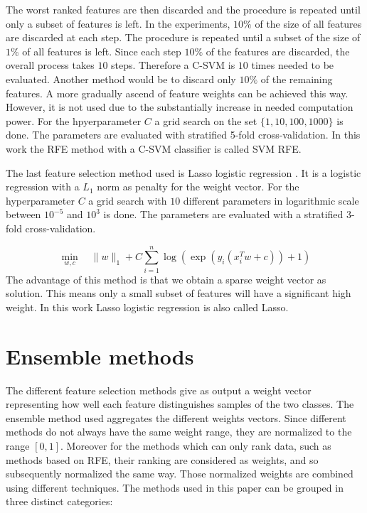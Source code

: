 \documentclass[twoside,11pt]{article}
\begin{document}
The worst ranked features are then discarded and the procedure is repeated until only a subset of features is left. In the experiments, $10\%$ of the size of all features are discarded at each step. The procedure is repeated until a subset of the size of $1\%$ of all features is left. Since each step $10\%$ of the features are discarded, the overall process takes $10$ steps. Therefore a C-SVM is $10$ times needed to be evaluated. Another method would be to discard only $10\%$ of the remaining features. A more gradually ascend of feature weights can be achieved this way. However, it is not used due to the substantially increase in needed computation power. For the hpyerparameter $C$ a grid search on the set $\{1, 10, 100, 1000\}$ is done. The parameters are evaluated with stratified 5-fold cross-validation. In this work the RFE method with a C-SVM classifier is called SVM RFE.

The last feature selection method used is Lasso logistic regression \citep{wheeler2010lasso}. It is a logistic regression with a $L_1$ norm as penalty for the weight vector. For the hyperparameter $C$ a grid search with $10$ different parameters in logarithmic scale between $10^{-5}$ and $10^3$ is done. The parameters are evaluated with a stratified 3-fold cross-validation.

\begin{equation}
    \min_{w,c} \quad \|w\|_1 + C\sum_{i=1}^n \log(\exp(y_i(x_i^Tw + c))+1)
  \end{equation}
  The advantage of this method is that we obtain a sparse weight vector as solution. This means only a small subset of features will have a significant high weight. In this work Lasso logistic regression is also called Lasso.
  \section{Ensemble methods}
  The different feature selection methods give as output a weight vector representing how well each feature distinguishes samples of the two classes. The ensemble method used aggregates the different weights vectors. Since different methods do not always have the same weight range, they are normalized to the range $[0,1]$. Moreover for the methods which can only rank data, such as methods based on RFE, their ranking are considered as weights, and so subsequently normalized the same way. 
  Those normalized weights are combined using different techniques. The methods used in this paper can be grouped in three distinct categories: 
\end{document}
